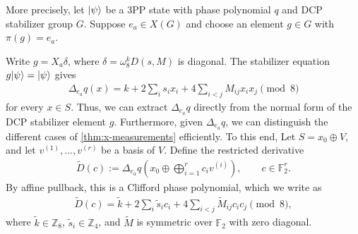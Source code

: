 More precisely, let $|\psi\rangle$ be a 3PP state with phase polynomial $q$ and DCP stabilizer group $G$. Suppose $e_a \in X(G)$ and choose an element $g \in G$ with $\pi(g) = e_a$.

Write $g=X_a\delta$, where $\delta=\omega_8^kD(s,M)$ is diagonal.
The stabilizer equation $g|\psi\rangle=|\psi\rangle$ gives
\begin{align}
    \Delta_{e_a}q(x)
    =k+2\sum_i s_i x_i+4\sum_{i<j}M_{ij}x_ix_j
    \pmod 8
\end{align}
for every $x\in S$.
Thus, we can extract $\Delta_{e_a} q$ directly from the normal form of the DCP stabilizer element $g$.
Furthermore, given $\Delta_{e_a} q$, we can distinguish the different cases of \cref{thm:x-measurements} efficiently.
To this end, Let $S=x_0\oplus V$, and let $v^{(1)},\ldots,v^{(r)}$ be a basis of $V$.
Define the restricted derivative
\begin{align}
    \widetilde D(c)
    :=\Delta_{e_a}q\left(x_0\oplus\bigoplus_{i=1}^r c_i v^{(i)}\right),
    \qquad c\in\mathbb F_2^r.
\end{align}
By affine pullback, this is a Clifford phase polynomial, which we write as
\begin{align}
    \widetilde D(c)
    =\tilde k+2\sum_i\tilde s_i c_i
    +4\sum_{i<j}\tilde M_{ij}c_ic_j
    \pmod 8,
\end{align}
where $\tilde k\in\mathbb Z_8$, $\tilde s_i\in\mathbb Z_4$, and $\tilde M$ is symmetric over $\mathbb F_2$ with zero diagonal.

